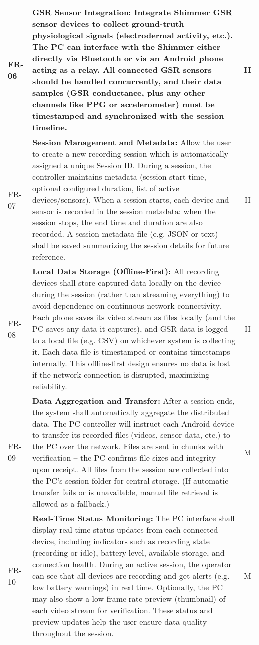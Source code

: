 \begin{table}[htbp]
\begin{tabular}{|p{1cm}|p{10cm}|c|}
\hline
FR-06 & \textbf{GSR Sensor Integration:} Integrate Shimmer GSR sensor devices to collect ground-truth physiological signals (electrodermal activity, etc.). The PC can interface with the Shimmer either directly via Bluetooth or via an Android phone acting as a relay. All connected GSR sensors should be handled concurrently, and their data samples (GSR conductance, plus any other channels like PPG or accelerometer) must be timestamped and synchronized with the session timeline. & H \\
\hline
FR-07 & \textbf{Session Management and Metadata:} Allow the user to create a new recording session which is automatically assigned a unique Session ID. During a session, the controller maintains metadata (session start time, optional configured duration, list of active devices/sensors). When a session starts, each device and sensor is recorded in the session metadata; when the session stops, the end time and duration are also recorded. A session metadata file (e.g. JSON or text) shall be saved summarizing the session details for future reference. & H \\
\hline
FR-08 & \textbf{Local Data Storage (Offline-First):} All recording devices shall store captured data locally on the device during the session (rather than streaming everything) to avoid dependence on continuous network connectivity. Each phone saves its video stream as files locally (and the PC saves any data it captures), and GSR data is logged to a local file (e.g. CSV) on whichever system is collecting it. Each data file is timestamped or contains timestamps internally. This offline-first design ensures no data is lost if the network connection is disrupted, maximizing reliability. & H \\
\hline
FR-09 & \textbf{Data Aggregation and Transfer:} After a session ends, the system shall automatically aggregate the distributed data. The PC controller will instruct each Android device to transfer its recorded files (videos, sensor data, etc.) to the PC over the network. Files are sent in chunks with verification -- the PC confirms file sizes and integrity upon receipt. All files from the session are collected into the PC's session folder for central storage. (If automatic transfer fails or is unavailable, manual file retrieval is allowed as a fallback.) & M \\
\hline
FR-10 & \textbf{Real-Time Status Monitoring:} The PC interface shall display real-time status updates from each connected device, including indicators such as recording state (recording or idle), battery level, available storage, and connection health. During an active session, the operator can see that all devices are recording and get alerts (e.g. low battery warnings) in real time. Optionally, the PC may also show a low-frame-rate preview (thumbnail) of each video stream for verification. These status and preview updates help the user ensure data quality throughout the session. & M \\

\end{tabular}
\end{table}

